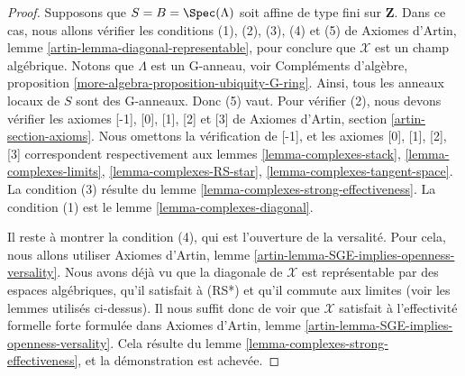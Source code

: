 \begin{proof}
\medskip\noindent
Supposons que $S = B = \Spec(\Lambda)$ soit affine de type fini sur
$\mathbf{Z}$. Dans ce cas, nous allons vérifier les conditions (1), (2), (3),
(4) et (5) de
Axiomes d'Artin, lemme \ref{artin-lemma-diagonal-representable}, pour conclure
que $\mathcal{X}$ est un champ algébrique.
Notons que $\Lambda$ est un G-anneau, voir
Compléments d'algèbre, proposition
\ref{more-algebra-proposition-ubiquity-G-ring}.
Ainsi, tous les anneaux locaux de $S$ sont des G-anneaux. Donc (5) vaut.
Pour vérifier (2), nous devons vérifier les axiomes [-1], [0], [1], [2] et [3]
de Axiomes d'Artin, section \ref{artin-section-axioms}.
Nous omettons la vérification de [-1], et les axiomes
[0], [1], [2], [3] correspondent respectivement aux
lemmes \ref{lemma-complexes-stack},
\ref{lemma-complexes-limits},
\ref{lemma-complexes-RS-star},
\ref{lemma-complexes-tangent-space}.
La condition (3) résulte du lemme
\ref{lemma-complexes-strong-effectiveness}.
La condition (1) est le lemme \ref{lemma-complexes-diagonal}.

\medskip\noindent
Il reste à montrer la condition (4), qui est l'ouverture de la versalité.
Pour cela, nous allons utiliser
Axiomes d'Artin, lemme \ref{artin-lemma-SGE-implies-openness-versality}.
Nous avons déjà vu que la diagonale de $\mathcal{X}$ est représentable par des
espaces algébriques, qu'il satisfait à (RS*) et qu'il commute aux
limites (voir les lemmes utilisés ci-dessus).
Il nous suffit donc de voir que $\mathcal{X}$ satisfait à l'effectivité
formelle forte formulée dans
Axiomes d'Artin, lemme \ref{artin-lemma-SGE-implies-openness-versality}.
Cela résulte du lemme \ref{lemma-complexes-strong-effectiveness}, et la
démonstration est achevée.
\end{proof}

















